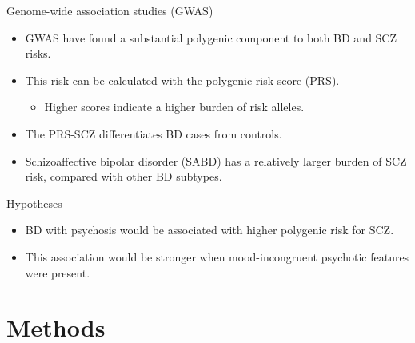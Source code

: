 \documentclass{beamer}
\begin{document}
\begin{frame}{Genome-wide association studies (GWAS)}
    \begin{itemize}
        \item GWAS have found a substantial polygenic component to both BD and SCZ risks.
        \item This risk can be calculated with the polygenic risk score (PRS).
            \begin{itemize}
                \item Higher scores indicate a higher burden of risk alleles.
            \end{itemize}
        \item The PRS-SCZ differentiates BD cases from controls.
        \item Schizoaffective bipolar disorder (SABD) has a relatively larger burden of SCZ risk, compared with other BD subtypes.
    \end{itemize}
\end{frame}

\begin{frame}{Hypotheses}
    \begin{itemize}
        \item BD with psychosis would be associated with higher polygenic risk for SCZ.
        \item This association would be stronger when mood-incongruent psychotic features were present.
    \end{itemize}
\end{frame}

\section{Methods}
\end{document}
